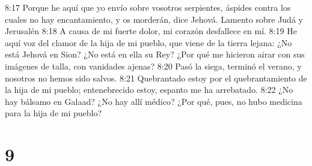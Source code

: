 8:17 Porque he aquí que yo envío sobre vosotros serpientes, áspides contra los cuales no hay encantamiento, y os morderán, dice Jehová.  
Lamento sobre Judá y Jerusalén  
8:18 A causa de mi fuerte dolor, mi corazón desfallece en mí.  
8:19 He aquí voz del clamor de la hija de mi pueblo, que viene de la tierra lejana: ¿No está Jehová en Sion? ¿No está en ella su Rey? ¿Por qué me hicieron airar con sus imágenes de talla, con vanidades ajenas?  
8:20 Pasó la siega, terminó el verano, y nosotros no hemos sido salvos.  
8:21 Quebrantado estoy por el quebrantamiento de la hija de mi pueblo; entenebrecido estoy, espanto me ha arrebatado.  
8:22 ¿No hay bálsamo en Galaad? ¿No hay allí médico? ¿Por qué, pues, no hubo medicina para la hija de mi pueblo?  

\chapter{9}

